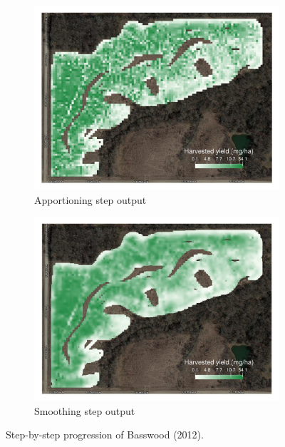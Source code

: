 \documentclass[12pt]{article}
\begin{document}
\begin{figure}
\begin{subfigure}[b]{0.49\textwidth}
    \includegraphics[width=1\textwidth]{appendix/basswood_2012_res5_1_aggregated}
    \caption{Apportioning step output}
  \end{subfigure}
  \begin{subfigure}[b]{0.49\textwidth}
    \centering
    \includegraphics[width=1\textwidth]{appendix/basswood_2012_res5_1_smoothed}
    \caption{Smoothing step output}
  \end{subfigure}
  \caption[Step-by-step visualization of the algorithm for one
  field]{Step-by-step progression of Basswood (2012).}%
  \label{fig:basswood2012-all-steps}
\end{figure}
\end{document}
